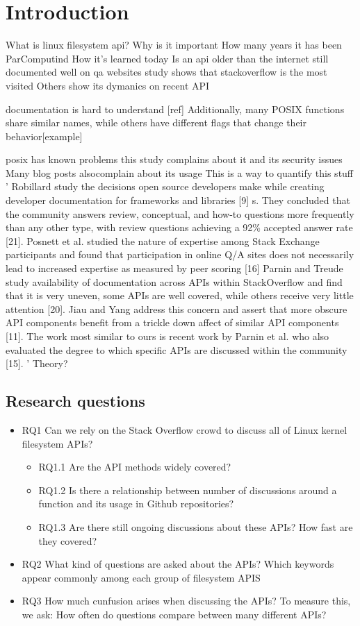 \section{Introduction}

What is linux filesystem api?
Why is it important
How many years it has been ParComputind
How it's learned today
Is an api older than the internet still documented well on qa websites
study shows that stackoverflow is the most visited
Others show its dymanics on recent API


documentation is hard to understand [ref]
Additionally, many POSIX functions share similar names, while others have different flags that change their behavior[example]

posix has known problems
this study complains about it and its security issues
Many blog posts alsocomplain about its usage
This is a way to quantify this stuff
'
Robillard study the decisions open source developers make while creating
developer documentation for frameworks and libraries [9]
s. They concluded that the community answers review, conceptual,
and how-to questions more frequently than any other type, with review questions
achieving a 92\% accepted answer rate [21]. Posnett et al. studied the nature of expertise
among Stack Exchange participants and found that participation in online Q/A sites
does not necessarily lead to increased expertise as measured by peer scoring [16]
Parnin and Treude study availability of documentation
across APIs within StackOverflow and find that it is very uneven, some APIs are well
covered, while others receive very little attention [20]. Jiau and Yang address this concern
and assert that more obscure API components benefit from a trickle down affect of
similar API components [11].
The work most similar to ours is recent work by Parnin et al. who also evaluated
the degree to which specific APIs are discussed within the community [15].
'
Theory?


\subsection{Research questions}
\begin{itemize}
  \item
  RQ1 Can we rely on the Stack Overflow crowd to discuss all of Linux kernel filesystem APIs?
  \begin{itemize}
    \item
    RQ1.1 Are the API methods widely covered?
    \item
    RQ1.2 Is there a relationship between number of discussions around a function and its usage in Github repositories?
    \item
    RQ1.3 Are there still ongoing discussions about these APIs? How fast are they covered?
  \end{itemize}
  \item
  RQ2 What kind of questions are asked about the APIs? Which keywords appear commonly among each group of filesystem APIS
  \item
  RQ3 How much cunfusion arises when discussing the APIs? To measure this, we ask: How often do questions compare between many different APIs?
\end{itemize}
